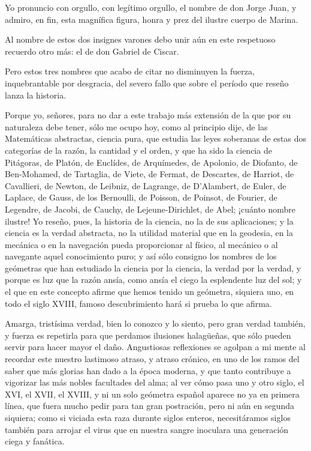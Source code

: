 \documentclass[a4paper, 12pt]{article}
\begin{document}
{{{{Yo pronuncio con orgullo, con legítimo orgullo, el nombre de don Jorge Juan, y admiro, en fin, esta magnífica figura, honra y prez del ilustre cuerpo de Marina.

Al nombre de estos dos insignes varones debo unir aún en este respetuoso recuerdo otro más: el de don Gabriel de Ciscar.

Pero estos tres nombres que acabo de citar no disminuyen la fuerza, inquebrantable por desgracia, del severo fallo que sobre el período que reseño lanza la historia.

Porque yo, señores, para no dar a este trabajo más extensión de la que por su naturaleza debe tener, sólo me ocupo hoy, como al principio dije, de las Matemáticas abstractas, ciencia pura, que estudia las leyes soberanas de estas dos categorías de la razón, la cantidad y el orden, y que ha sido la ciencia de Pitágoras, de Platón, de Euclídes, de Arquímedes, de Apolonio, de Diofanto, de Ben-Mohamed, de Tartaglia, de Viete, de Fermat, de Descartes, de Harriot, de Cavallieri, de Newton, de Leibniz, de Lagrange, de D'Alambert, de Euler, de Laplace, de Gauss, de los Bernoulli, de Poisson, de Poinsot, de Fourier, de Legendre, de Jacobi, de Cauchy, de Lejeune-Dirichlet, de Abel; ¡cuánto nombre ilustre!  Yo reseño, pues, la historia de la ciencia, no la de sus aplicaciones; y la ciencia es la verdad abstracta, no la utilidad material que en la geodesia, en la mecánica o en la navegación pueda proporcionar al físico, al mecánico o al navegante aquel conocimiento puro; y así sólo consigno los nombres de los geómetras que han estudiado la ciencia por la ciencia, la verdad por la verdad, y porque es luz que la razón ansía, como ansía el ciego la esplendente luz del sol; y el que en este concepto afirme que hemos tenido un geómetra, siquiera uno, en todo el siglo XVIII, famoso descubrimiento hará si prueba lo que afirma.


Amarga, tristísima verdad, bien lo conozco y lo siento, pero gran verdad también, y fuerza es repetirla para que perdamos ilusiones halagüeñas, que sólo pueden servir para hacer mayor el daño.  Angustiosas reflexiones se agolpan a mi mente al recordar este nuestro lastimoso atraso, y atraso crónico, en uno de los ramos del saber que más glorias han dado a la época moderna, y que tanto contribuye a vigorizar las más nobles facultades del alma; al ver cómo pasa uno y otro siglo, el XVI, el XVII, el XVIII, y ni un solo geómetra español aparece no ya en primera línea, que fuera mucho pedir para tan gran postración, pero ni aún en segunda siquiera; como si viciada esta raza durante siglos enteros, necesitáramos siglos también para arrojar el virus que en nuestra sangre inoculara una generación ciega y fanática.

}}}}
\end{document}
